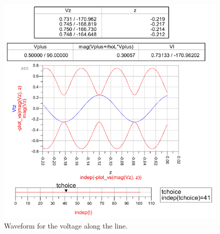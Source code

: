 \begin{figure}[H] 
\centering
\includegraphics[width=12cm]{images/lab1_p3_waveform.png}
\caption{Waveform for the voltage along the line.}
\label{p3:waveform} 
\end{figure}